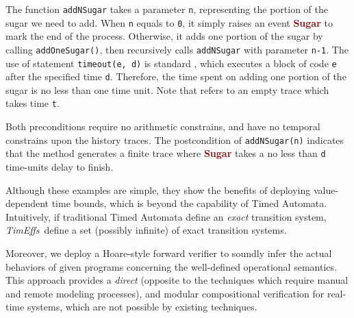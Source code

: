 \documentclass[acmsmall,10pt,review]{acmart}
\newcommand{\codem}[1]{{\lstinline[basicstyle=\small\ttfamily]|#1|}}
\newcommand{\timedEffects}{\emph{TimEffs}}
\newcommand{\effect}{{\ensuremath{\mathrm{\Phi}}}}
\newcommand{\anyevent}[1]{{\textcolor{darkred}
{{\textbf{\small #1}}}}}
\newcommand{\code}[1]{{\tt{\ensuremath{\m{#1}}}}}
\newcommand{\m}{\mathit}
\newcommand{\mysharp}{{\mathrel{\texttt{\#}}}}
\def\defeq{\ensuremath{\,\triangleq}}
\begin{document}
The function \codem{addNSugar} takes a parameter \codem{n}, representing 
the portion of the sugar we need to add. When \codem{n} 
equals to \codem{0}, 
it simply raises an event \anyevent{Sugar} to mark the end of the process. 
Otherwise, it adds one portion of the sugar by calling
\codem{addOneSugar()}, then recursively calls 
\codem{addNSugar} with parameter \codem{n-1}. 
The use of statement \lstinline|timeout(e, d)| is standard \cite{JSTO}, 
which executes a block of code \codem{e} after the specified time \codem{d}.
Therefore, the time spent on adding one portion of the sugar is 
no less than one time unit. Note that {\color{darklavender}\code{\emph{emp\#t}}} 
refers to an empty trace which takes time \codem{t}. 

Both preconditions require no arithmetic constrains,   
and  have no temporal constrains upon 
the history traces. 
The postcondition of \codem{addNSugar(n)} indicates that  the method 
generates a finite trace where \anyevent{Sugar} takes a no 
less 
than \codem{d} time-units delay to finish. 

Although these examples are simple, they show the benefits of deploying 
value-dependent 
time bounds, which is beyond the capability of Timed Automata. Intuitively, if traditional Timed Automata define an 
\emph{exact} transition system, \timedEffects\ define 
a set (possibly infinite) of exact transition systems. 


Moreover, we deploy a Hoare-style forward verifier to 
soundly infer the actual behaviors of given programs 
concerning the well-defined operational semantics. 
This approach provides a 
\emph{direct} (opposite to the techniques which require 
 manual and remote modeling processes), 
  and modular compositional 
verification for real-time systems, which are not possible
by existing techniques. 




   


\begin{comment}
  we express, the effects of \code{addNSugar(d)} as:
\begin{align*}
&\code{\effect^{send (d)} \defeq \  (0 {<} d {\leq}5 \wedge  0 {\leq} t {<} d),  ({\anyevent{Send} \mysharp  t)} \cdot \anyevent{Done}}.
\end{align*}  
effects of \code{addNSugar(n)} as:
\code{(n{>}0  \wedge  t {\geq} n) : ({Sugar \mysharp  t)}}

\end{comment}
\end{document}
